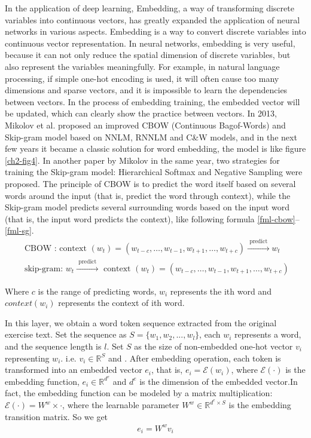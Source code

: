 In the application of deep learning, Embedding, a way of transforming discrete variables into continuous vectors, has greatly expanded the application of neural networks in various aspects. Embedding is a way to convert discrete variables into continuous vector representation. In neural networks, embedding is very useful, because it can not only reduce the spatial dimension of discrete variables, but also represent the variables meaningfully. For example, in natural language processing, if simple one-hot encoding is used, it will often cause too many dimensions and sparse vectors, and it is impossible to learn the dependencies between vectors. In the process of embedding training, the embedded vector will be updated, which can clearly show the practice between vectors. In 2013, Mikolov et al. proposed an improved CBOW (Continuous Bagof-Words) and Skip-gram model based on NNLM, RNNLM and C&W models\cite{mikolov2013efficient}, and in the next few years it became a classic solution for word embedding, the model is like figure \ref{ch2-fig4}. In another paper by Mikolov in the same year, two strategies for training the Skip-gram model: Hierarchical Softmax and Negative Sampling were proposed\cite{mikolov2013distributed}. The principle of CBOW is to predict the word itself based on several words around the input (that is, predict the word through context), while the Skip-gram model predicts several surrounding words based on the input word (that is, the input word predicts the context), like following formula \ref{fml-cbow}--\ref{fml-sg}.
\begin{align}
	\text { CBOW : context }\left(w_{t}\right)=\left(w_{t-c}, \ldots, w_{t-1}, w_{t+1}, \ldots, w_{t+c}\right) \stackrel{\text { predict }}{\longrightarrow} w_{t} \label{fml-cbow} \\
	\text { skip-gram: } w_{t} \stackrel{\text { predict }}{\longrightarrow} \text { context }\left(w_{t}\right)=\left(w_{t-c}, \ldots, w_{t-1}, w_{t+1}, \ldots, w_{t+c}\right) \label{fml-sg}
\end{align}

Where $c$ is the range of predicting words, $w_i$ represents the ith word and $context(w_i)$ represents the context of ith word.

In this layer, we obtain a word token sequence extracted from the original exercise text. Set the sequence as $S=\{w_1,w_2,...,w_l\}$, each $w_i$ represents a word, and the sequence length is $l$. Set $S$ as the size of non-embedded one-hot vector $v_i$ representing $w_i$. i.e. $v_i\in \mathbb{R}^{S}$ and . After embedding operation, each token is transformed into an embedded vector $e_i$, that is, $e_i=\mathcal{E}(w_i)$, where $\mathcal{E}(\cdot)$ is the embedding function, $e_i\in \mathbb{R}^{d^{e}}$ and $d^e$ is the dimension of the embedded vector.In fact, the embedding function can be modeled by a matrix multiplication: $ \mathcal {E} (\cdot) = W^w\times \cdot$, where the learnable parameter $W^w\in \mathbb {R} ^ {d^{e}\times S} $ is the embedding transition matrix. So we get
\begin{align}
	e_i = W^w v_i
\end{align}


